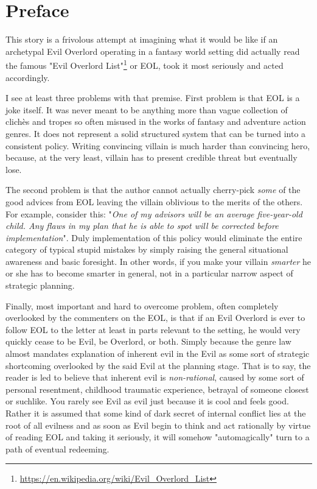 \chapter*{Preface}


This story is a frivolous attempt at imagining what it would be like if an archetypal Evil Overlord operating in a fantasy world setting did actually read the famous "Evil Overlord List"\footnote{\url{https://en.wikipedia.org/wiki/Evil_Overlord_List}} or EOL, took it most seriously and acted accordingly.

I see at least three problems with that premise. First problem is that EOL is a joke itself. It was never meant to be anything more than vague collection of clich\`es and tropes so often misused in the works of fantasy and adventure action genres. It does not represent a solid structured system that can be turned into a consistent policy. Writing convincing villain is much harder than convincing hero, because, at the very least, villain has to present credible threat but eventually lose.

The second problem is that the author cannot actually cherry-pick \textit{some} of the good advices from EOL leaving the villain oblivious to the merits of the others. For example, consider this: "\textit{One of my advisors will be an average five-year-old child. Any flaws in my plan that he is able to spot will be corrected before implementation}". Duly implementation of this policy would eliminate the entire category of typical stupid mistakes by simply raising the general situational awareness and basic foresight. In other words, if you make your villain \textit{smarter} he or she has to become smarter in general, not in a particular narrow aspect of strategic planning.

Finally, most important and hard to overcome problem, often completely overlooked by the commenters on the EOL, is that if an Evil Overlord is ever to follow EOL to the letter at least in parts relevant to the setting, he would very quickly cease to be Evil, be Overlord, or both. Simply because the genre law almost mandates explanation of inherent evil in the Evil as some sort of strategic shortcoming overlooked by the said Evil at the planning stage. That is to say, the reader is led to believe that inherent evil is \textit{non-rational}, caused by some sort of personal resentment, childhood traumatic experience, betrayal of someone closest or suchlike. You rarely see Evil as evil just because it is cool and feels good. Rather it is assumed that some kind of dark secret of internal conflict lies at the root of all evilness and as soon as Evil begin to think and act rationally by virtue of reading EOL and taking it seriously, it will somehow "automagically" turn to a path of eventual redeeming.

